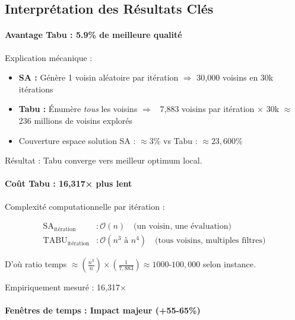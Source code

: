 \documentclass[12pt,a4paper,twoside]{report}
\begin{document}
\subsection{Interprétation des Résultats Clés}

\paragraph{Avantage Tabu : 5.9\% de meilleure qualité}

Explication mécanique :
\begin{itemize}
    \item \textbf{SA :} Génère 1 voisin aléatoire par itération $\Rightarrow$ 30,000 voisins en 30k itérations
    \item \textbf{Tabu :} Énumère \textit{tous} les voisins $\Rightarrow$ ~7,883 voisins par itération $\times$ 30k $\approx$ 236 millions de voisins explorés
    \item Couverture espace solution SA : $\approx 3\%$ vs Tabu : $\approx 23,600\%$
\end{itemize}

Résultat : Tabu converge vers meilleur optimum local.

\paragraph{Coût Tabu : 16,317× plus lent}

Complexité computationnelle par itération :

\begin{align}
    \text{SA}_{\text{itération}}   & : \mathcal{O}(n) \quad \text{(un voisin, une évaluation)}                        \\
    \text{TABU}_{\text{itération}} & : \mathcal{O}(n^3 \text{ à } n^4) \quad \text{(tous voisins, multiples filtres)}
\end{align}

D'où ratio temps $\approx \left(\frac{n^3}{n}\right) \times
    \left(\frac{1}{7,883}\right) \approx 1000$-$100,000$ selon instance.

Empiriquement mesuré : 16,317×

\paragraph{Fenêtres de temps : Impact majeur (+55-65\%)}
\end{document}

